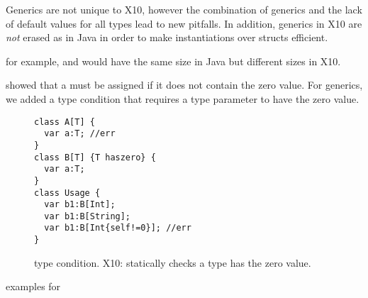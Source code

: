 Generics are not unique to X10,
    however the combination of generics and the lack of default values for all types
    lead to new pitfalls.
In addition, generics in X10 are \emph{not} erased as in Java
    in order to make instantiations over structs efficient.

for example,  and 
    would have the same size in Java but different sizes in X10.

 showed that a  must be assigned if
    it does not contain the zero value.
For generics, we added a  type condition that requires a type parameter to have the zero value.

\begin{figure}
\begin{lstlisting}
class A[T] {
  var a:T; //err
}
class B[T] {T haszero} {
  var a:T;
}
class Usage {
  var b1:B[Int];
  var b1:B[String];
  var b1:B[Int{self!=0}]; //err
}
\end{lstlisting}
\caption{ type condition.
    X10: statically checks a type has the zero value.}
\label{Figure:Generics}
\end{figure}


examples for 

